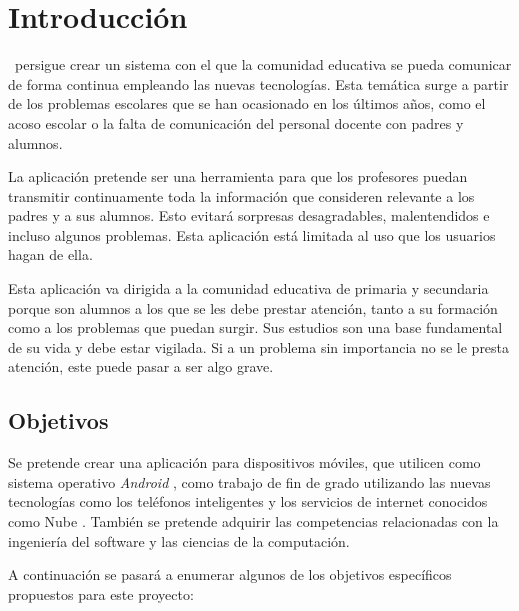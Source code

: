 %
%
%
%

\cleardoublepage
\chapter{Introducción}
\label{chap:intorduction}

	\CollegeApp\ persigue crear un sistema con el que la comunidad educativa se pueda comunicar de forma continua empleando las nuevas tecnologías. Esta temática surge a partir de los problemas escolares que se han ocasionado en los últimos años, como el acoso escolar o la falta de comunicación del personal docente con padres y alumnos.
	
	\bigskip
	La aplicación pretende ser una herramienta para que los profesores puedan transmitir continuamente toda la información que consideren relevante a los padres y a sus alumnos. Esto evitará sorpresas desagradables, malentendidos e incluso algunos problemas.
	Esta aplicación está limitada al uso que los usuarios hagan de ella.
	
	\bigskip
	Esta aplicación va dirigida a la comunidad educativa de primaria y secundaria porque son alumnos a los que se les debe prestar atención, tanto a su formación como a los problemas que puedan surgir. Sus estudios son una base fundamental de su vida y debe estar vigilada. Si a un problema sin importancia no se le presta atención, este puede pasar a ser algo grave.
	
	\section{Objetivos}
		
		Se pretende crear una aplicación para dispositivos móviles, que utilicen como sistema operativo {\it Android} \cite{2:android:online}, como trabajo de fin de grado utilizando las nuevas tecnologías como los teléfonos inteligentes y los servicios de internet conocidos como Nube \cite{57:nube:online}. También se pretende adquirir las competencias relacionadas con la ingeniería del software y las ciencias de la computación. 
		
		A continuación se pasará a enumerar algunos de los objetivos específicos propuestos para este proyecto:
		
